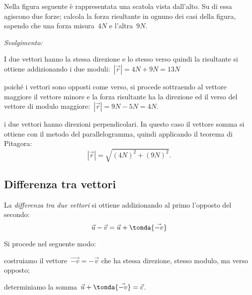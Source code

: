 \begin{esempio}
Nella figura seguente è rappresentata una scatola vista dall'alto. Su di essa 
agiscono due forze; calcola la forza risultante in ognuno dei casi della 
figura,
sapendo che una forza misura~$4 \unit{N}$ e l'altra~$9 \unit{N}$.
\begin{center}
 
\end{center}
\emph{Svolgimento:}
\begin{enumeratea}
\item I due vettori hanno la stessa direzione e lo stesso verso quindi la 
risultante si ottiene addizionando i due moduli:~$|\vec{r}|=4 \unit{N}+9 
\unit{N}=13 \unit{N}$
\item poiché i vettori sono opposti come verso, si procede sottraendo al 
vettore maggiore il vettore minore e la forza risultante ha la direzione ed 
il 
verso
del vettore di modulo maggiore:~$|\vec{r}|=9 \unit{N} - 5 \unit{N}=4 
\unit{N}$.
\item i due vettori hanno direzioni perpendicolari. In questo caso il vettore 
somma si ottiene con il metodo del parallelogramma, quindi applicando il 
teorema di Pitagora:
\[|\vec{r}|=\sqrt{(4 \unit{N})^2+(9 \unit{N})^2}.\]
\end{enumeratea}
\end{esempio}

\subsection{Differenza tra vettori}

La \emph{differenza tra due vettori} si ottiene addizionando al primo 
l'opposto del secondo: 
\[\vec{u} - \vec{v} = \vec{u} + \tonda{\vec{-v}}\]

\begin{minipage}{.59 \textwidth}
Si procede nel seguente modo:
\begin{enumeratea}
\item costruiamo il vettore~$\vec{-v}=-\vec{v}$ che ha stessa direzione, 
stesso modulo, ma verso opposto;
\item determiniamo la somma~$\vec{u}+\tonda{\vec{-v}} = \vec{c}$.
\end{enumeratea}
\end{minipage}
\hfill
\begin{minipage}{.39 \textwidth}
\begin{inaccessibleblock}
 \begin{center}
  \scalebox{.8}{}
 \end{center}
\end{inaccessibleblock}
\end{minipage}

